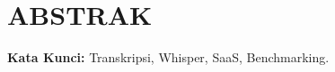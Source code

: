 \chapter*{ABSTRAK}

\begin{singlespace}
    \lipsum[1]
    
    \vspace{1cm}
    \noindent \textbf{Kata Kunci:} Transkripsi, Whisper, SaaS, Benchmarking.
\end{singlespace}
